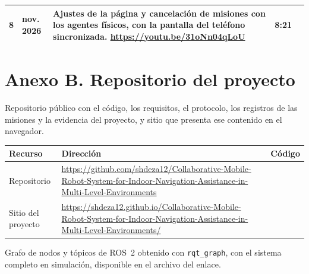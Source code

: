 \begin{table}[H]
\begin{tabular}{@{}c >{\raggedright\arraybackslash}p{} p{} c c@{}}
    8 & 1 nov. 2026 & Ajustes de la página y cancelación de misiones con los agentes físicos, con la pantalla del teléfono sincronizada. \newline \url{https://youtu.be/31oNn04qLoU} & 8:21 & \raisebox{-0.85\height}{\qrcode[height=1.25cm]{https://youtu.be/31oNn04qLoU}} \\ \bottomrule
  \end{tabular}
\end{table}

\chapter*{Anexo B. Repositorio del proyecto}

Repositorio público con el código, los requisitos, el protocolo, los registros de las misiones y la evidencia del proyecto, y sitio que presenta ese contenido en el navegador.

\begin{table}[H]
  \centering\small
  \renewcommand{\arraystretch}{1.3}
  \begin{tabular}{@{}p{} p{} c@{}}
    \toprule
    \textbf{Recurso} & \textbf{Dirección} & \textbf{Código} \\ \midrule
    Repositorio & \url{https://github.com/shdeza12/Collaborative-Mobile-Robot-System-for-Indoor-Navigation-Assistance-in-Multi-Level-Environments} & \raisebox{-0.85\height}{\qrcode[height=2cm]{https://github.com/shdeza12/Collaborative-Mobile-Robot-System-for-Indoor-Navigation-Assistance-in-Multi-Level-Environments}} \\ \addlinespace
    Sitio del proyecto & \url{https://shdeza12.github.io/Collaborative-Mobile-Robot-System-for-Indoor-Navigation-Assistance-in-Multi-Level-Environments/} & \raisebox{-0.85\height}{\qrcode[height=2cm]{https://shdeza12.github.io/Collaborative-Mobile-Robot-System-for-Indoor-Navigation-Assistance-in-Multi-Level-Environments/}} \\ \bottomrule
  \end{tabular}
\end{table}


Grafo de nodos y tópicos de ROS~2 obtenido con \texttt{rqt\_graph}, con el sistema completo en simulación, disponible en el archivo del enlace.


